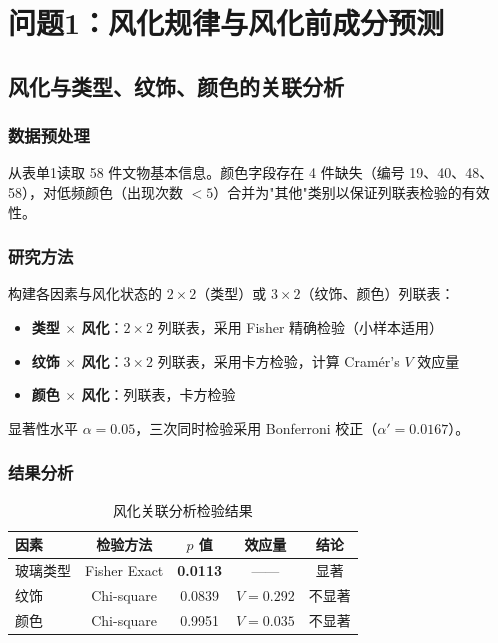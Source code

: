 \section{问题1：风化规律与风化前成分预测}

\subsection{风化与类型、纹饰、颜色的关联分析}

\subsubsection{数据预处理}

从表单1读取 58 件文物基本信息。颜色字段存在 4 件缺失（编号 19、40、48、58），对低频颜色（出现次数 $< 5$）合并为"其他"类别以保证列联表检验的有效性。

\subsubsection{研究方法}

构建各因素与风化状态的 $2 \times 2$（类型）或 $3 \times 2$（纹饰、颜色）列联表：
\begin{itemize}
    \item \textbf{类型 $\times$ 风化}：$2 \times 2$ 列联表，采用 Fisher 精确检验（小样本适用）
    \item \textbf{纹饰 $\times$ 风化}：$3 \times 2$ 列联表，采用卡方检验，计算 Cramér's $V$ 效应量
    \item \textbf{颜色 $\times$ 风化}：列联表，卡方检验
\end{itemize}

显著性水平 $\alpha = 0.05$，三次同时检验采用 Bonferroni 校正（$\alpha' = 0.0167$）。

\subsubsection{结果分析}

\begin{table}[H]
    \centering
    \caption{风化关联分析检验结果}
    \label{tab:weathering_test}
    \begin{tabular}{l c c c c}
        \toprule
        \textbf{因素} & \textbf{检验方法} & \textbf{$p$ 值} & \textbf{效应量} & \textbf{结论} \\
        \midrule
        玻璃类型 & Fisher Exact & \textbf{0.0113} & —— & 显著 \\
        纹饰 & Chi-square & 0.0839 & $V = 0.292$ & 不显著 \\
        颜色 & Chi-square & 0.9951 & $V = 0.035$ & 不显著 \\
        \bottomrule
    \end{tabular}
\end{table}

